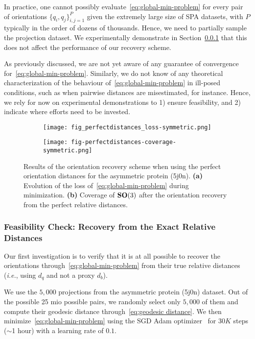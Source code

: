 In practice, one cannot possibly evaluate~\eqref{eq:global-min-problem} for every pair of orientations $\big\{q_i,q_j\big\}_{i,j=1}^P$ given the extremely large size of SPA datasets, with $P$ typically in the order of dozens of thousands. Hence, we need to partially sample the projection dataset. We experimentally demonstrate in Section~\ref{subsec:5-6-3-sanity-check} that this does not affect the performance of our recovery scheme.

As previously discussed, we are not yet aware of any guarantee of convergence for~\eqref{eq:global-min-problem}. Similarly, we do not know of any theoretical characterization of the behaviour of~\eqref{eq:global-min-problem} in ill-posed conditions, such as when pairwise distances are misestimated, for instance. Hence, we rely for now on experimental demonstrations to 1) ensure feasibility, and 2) indicate where efforts need to be invested.

\begin{figure}[t]
    \centering
    \begin{subfigure}[b]{0.48\textwidth}
        \texttt{[image: fig\_perfectdistances\_loss-symmetric.png]}
        \caption{}
    \end{subfigure} \quad
    \begin{subfigure}[b]{0.48\textwidth}
    \centering
        \texttt{[image: fig-perfectdistances-coverage-symmetric.png]}
        \caption{}
    \end{subfigure}
    \caption{Results of the orientation recovery scheme when using the perfect orientation distances for the asymmetric protein (5j0n). \textbf{(a)} Evolution of the loss of~\eqref{eq:global-min-problem} during minimization. \textbf{(b)} Coverage of $\mathrm{\mathbf{SO}}(3)$ after the orientation recovery from the perfect relative distances. }
    \label{fig:minim-loss-perfect-distances}
\end{figure}

\subsubsection{Feasibility Check: Recovery from the Exact Relative Distances}
\label{subsec:5-6-3-sanity-check}

Our first investigation is to verify that it is at all possible to recover the orientations through~\eqref{eq:global-min-problem} from their true relative distances (\textit{i.e.}, using $d_q$ and not a proxy $d_b$).

We use the $5,000$ projections from the asymmetric protein (5j0n) dataset. Out of the possible 25 mio possible pairs, we randomly select only $5,000$ of them and compute their geodesic distance through~\eqref{eq:geodesic distance}. We then minimize~\eqref{eq:global-min-problem} using the SGD Adam optimizer~\cite{kingma2014adam} for $30K$ steps ($\sim$1 hour) with a learning rate of $0.1$.

